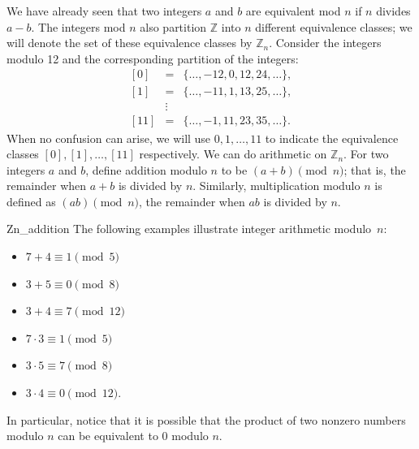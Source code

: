We have already seen that two integers $a$ and $b$ are equivalent mod $n$ if $n$ divides $a - b$.  The integers mod $n$ also partition ${\mathbb Z}$ into $n$ different equivalence classes; we will denote the set of these equivalence classes by ${\mathbb Z}_n$.  Consider the integers modulo 12 and the corresponding partition of the integers:  
\begin{eqnarray*}
{[0]} & = & \{ \ldots, -12, 0, 12, 24, \ldots \}, \\
{[1]} & = & \{ \ldots, -11, 1, 13, 25, \ldots \}, \\
      & \vdots & \\
{[11]} & = & \{ \ldots, -1, 11, 23, 35, \ldots \}.
\end{eqnarray*}
When no confusion can arise, we will use $0, 1, \ldots, 11$ to indicate the equivalence classes  ${[0]}, {[1]}, \ldots, {[11]}$ respectively.  We can do arithmetic on ${\mathbb Z}_n$.  For two integers $a$ and $b$, define addition modulo $n$ to be $(a + b) \pmod{n}$; that is, the remainder when $a + b$ is divided by $n$.  Similarly, multiplication modulo $n$ is defined as $(a  b) \pmod{ n}$, the remainder when $a  b$ is divided by $n$.



\begin{example}{Zn_addition}
The following examples illustrate integer arithmetic modulo~$n$:
\begin{multicols}{2}
\begin{itemize}

\item[]
$7 + 4  \equiv  1 \pmod{ 5}$ 

\item[]
$3 + 5 \equiv  0 \pmod{ 8}$ 

\item[]
$3 + 4  \equiv  7 \pmod{ 12}$

\item[]
$7 \cdot 3 \equiv 1 \pmod{ 5}$ 

\item[]
$3 \cdot 5  \equiv  7 \pmod{ 8}$

\item[]
$3 \cdot 4  \equiv  0 \pmod{ 12}$.

\end{itemize}
\end{multicols}
In particular, notice that it is possible that the product of two nonzero numbers modulo $n$ can be equivalent to $0 $ modulo $n$. 
\end{example}

